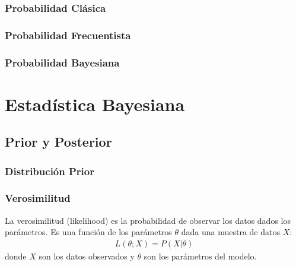 \documentclass[a4paper]{report} %
\begin{document}
\subsubsection{Probabilidad Cl\'asica}
\subsubsection{Probabilidad Frecuentista}
\subsubsection{Probabilidad Bayesiana}
\section{Estad\'istica Bayesiana}
\subsection{Prior y Posterior}
\subsubsection{Distribuci\'on Prior}
\subsubsection{Verosimilitud}
La verosimilitud (likelihood) es la probabilidad de observar los datos dados los par\'ametros. Es una funci\'on de los par\'ametros $\theta$ dada una muestra de datos $X$:
\begin{eqnarray*}
L(\theta; X) = P(X|\theta)
\end{eqnarray*}
donde $X$ son los datos observados y $\theta$ son los par\'ametros del modelo.
\end{document}
